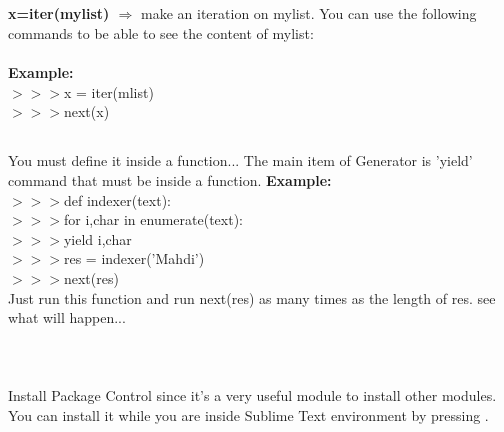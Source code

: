 \documentclass[a4paper,18pt]{article}
\begin{document}
\subsection{\colorbox {matgreen}{\color{white}{\large Iterator}}}
\textbf{x=iter(mylist) $\Rightarrow$} make an iteration on mylist. You can use the following commands to be able to see the content of mylist:\\\\
\textbf{Example:\\}
$>>>$x = iter(mlist)\\

$>>>$next(x)\\


\subsection{\colorbox {matgreen}{\color{white}{\large Python Generator}}}
You must define it inside a function... The main item of Generator is 'yield' command that must be inside a function.
\textbf{Example:\\}
$>>>$def indexer(text):\\

$>>>$\hspace*{14pt}for i,char in enumerate(text):\\

$>>>$\hspace*{28pt}yield i,char\\

$>>>$res = indexer('Mahdi')\\

$>>>$next(res)\\

Just run this function and run next(res) as many times as the length of res. see what will happen...\\\\
\newpage

\section{\colorbox {Abi}{}}
\subsection{\colorbox {matgreen}{\color{white}{\large First, install Package Control}}}
Install Package Control since it's a very useful module to install other modules. You can install it while you are inside Sublime Text environment by pressing {\textbf{\color{Red}{Ctrl+Shift+P}}}.\\\\
\end{document}
